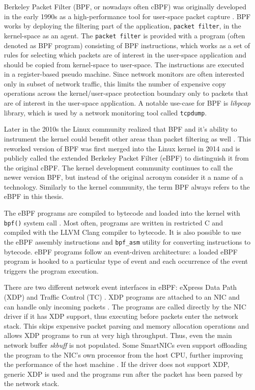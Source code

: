 \documentclass[english, 12pt, a4paper, sci, utf8, a-2b, online]{aaltothesis}
\begin{document}
Berkeley Packet Filter (BPF, or nowadays often cBPF) was originally developed in the early 1990s as a high-performance tool for user-space packet capture \cite{mccanne1993bsd}.
BPF works by deploying the filtering part of the application, \texttt{packet filter}, in the kernel-space as an agent.
The \texttt{packet filter} is provided with a program (often denoted as BPF program) consisting of BPF instructions, which works as a set of rules for selecting which packets are of interest in the user-space application and should be copied from kernel-space to user-space.
The instructions are executed in a register-based pseudo machine.
Since network monitors are often interested only in subset of network traffic, this limits the number of expensive copy operations across the kernel/user-space protection boundary only to packets that are of interest in the user-space application.
A notable use-case for BPF is \emph{libpcap} library, which is used by a network monitoring tool called \texttt{tcpdump}.

Later in the 2010s the Linux community realized that BPF and it's ability to instrument the kernel could benefit other areas than packet filtering as well \cite{vieira2020fast}.
This reworked version of BPF was first merged into the Linux kernel in 2014 and is publicly called the extended Berkeley Packet Filter (eBPF) to distinguish it from the original cBPF.
The kernel development community continues to call the newer version BPF, but instead of the original acronym consider it a name of a technology.
Similarly to the kernel community, the term BPF always refers to the eBPF in this thesis.

The eBPF programs are compiled to bytecode and loaded into the kernel with \texttt{bpf()} system call \cite{miano2021framework}.
Most often, programs are written in restricted C and compiled with the LLVM Clang compiler to bytecode.
It is also possible to use the eBPF assembly instructions and \texttt{bpf\_asm} utility for converting instructions to bytecode.
eBPF programs follow an event-driven architecture: a loaded eBPF program is hooked to a particular type of event and each occurrence of the event triggers the program execution.

There are two different network event interfaces in eBPF: eXpress Data Path (XDP) and Traffic Control (TC) \cite{miano2021framework}.
XDP programs are attached to an NIC and can handle only incoming packets \cite{hoiland2018express}.
The programs are called directly by the NIC driver if it has XDP support, thus executing before packets enter the network stack.
This skips expensive packet parsing and memory allocation operations and allows XDP programs to run at very high throughput.
Thus, even the main network buffer \emph{skbuff} is not populated.
Some SmartNICs even support offloading the program to the NIC's own processor from the host CPU, further improving the performance of the host machine \cite{cilium-program-types}.
If the driver does not support XDP, generic XDP is used and the programs run after the packet has been parsed by the network stack.
\end{document}
